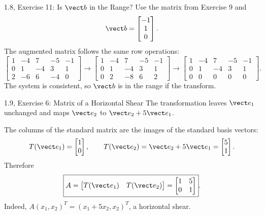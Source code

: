 \begin{frame}{1.8, Exercise 11: Is $\vect b$ in the Range?}
\footnotesize
Use the matrix from Exercise 9 and
\[
\vect b=\begin{bmatrix}-1\\1\\0\end{bmatrix}.
\]
The augmented matrix follows the same row operations:
\[
\left[\begin{array}{cccc|c}
1&-4&7&-5&-1\\0&1&-4&3&1\\2&-6&6&-4&0
\end{array}\right]
\longrightarrow
\left[\begin{array}{cccc|c}
1&-4&7&-5&-1\\0&1&-4&3&1\\0&2&-8&6&2
\end{array}\right]
\longrightarrow
\left[\begin{array}{cccc|c}
1&-4&7&-5&-1\\0&1&-4&3&1\\0&0&0&0&0
\end{array}\right].
\]
The system is consistent, so $\vect b$ is in the range if the transform.
\end{frame}

\begin{frame}{1.9, Exercise 6: Matrix of a Horizontal Shear}
The transformation leaves $\vect e_1$ unchanged and maps
$\vect e_2$ to $\vect e_2+5\vect e_1$.
\pause

The columns of the standard matrix are the images of the standard basis vectors:
\[
T(\vect e_1)=\begin{bmatrix}1\\0\end{bmatrix},
\qquad
T(\vect e_2)=\vect e_2+5\vect e_1
=\begin{bmatrix}5\\1\end{bmatrix}.
\]
Therefore
\[
\boxed{A=\begin{bmatrix}T(\vect e_1)&T(\vect e_2)\end{bmatrix}
=\begin{bmatrix}1&5\\0&1\end{bmatrix}}.
\]
Indeed, $A(x_1,x_2)^T=(x_1+5x_2,x_2)^T$, a horizontal shear.
\end{frame}

